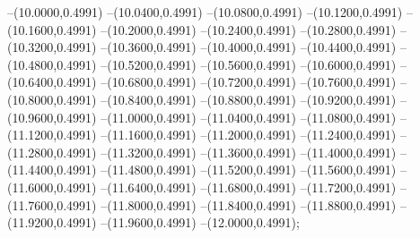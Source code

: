 {	--(10.0000,0.4991)
	--(10.0400,0.4991)
	--(10.0800,0.4991)
	--(10.1200,0.4991)
	--(10.1600,0.4991)
	--(10.2000,0.4991)
	--(10.2400,0.4991)
	--(10.2800,0.4991)
	--(10.3200,0.4991)
	--(10.3600,0.4991)
	--(10.4000,0.4991)
	--(10.4400,0.4991)
	--(10.4800,0.4991)
	--(10.5200,0.4991)
	--(10.5600,0.4991)
	--(10.6000,0.4991)
	--(10.6400,0.4991)
	--(10.6800,0.4991)
	--(10.7200,0.4991)
	--(10.7600,0.4991)
	--(10.8000,0.4991)
	--(10.8400,0.4991)
	--(10.8800,0.4991)
	--(10.9200,0.4991)
	--(10.9600,0.4991)
	--(11.0000,0.4991)
	--(11.0400,0.4991)
	--(11.0800,0.4991)
	--(11.1200,0.4991)
	--(11.1600,0.4991)
	--(11.2000,0.4991)
	--(11.2400,0.4991)
	--(11.2800,0.4991)
	--(11.3200,0.4991)
	--(11.3600,0.4991)
	--(11.4000,0.4991)
	--(11.4400,0.4991)
	--(11.4800,0.4991)
	--(11.5200,0.4991)
	--(11.5600,0.4991)
	--(11.6000,0.4991)
	--(11.6400,0.4991)
	--(11.6800,0.4991)
	--(11.7200,0.4991)
	--(11.7600,0.4991)
	--(11.8000,0.4991)
	--(11.8400,0.4991)
	--(11.8800,0.4991)
	--(11.9200,0.4991)
	--(11.9600,0.4991)
	--(12.0000,0.4991);
}
